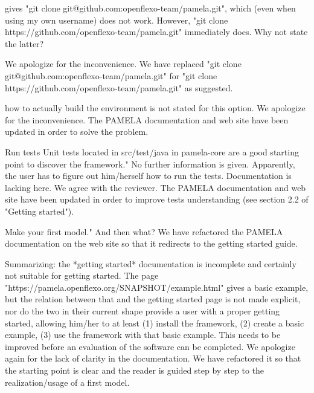 \documentclass[10pt]{article}
\begin{document}

\begin{response}{gives "git clone git@github.com:openflexo-team/pamela.git", which (even when using my own username) does not work. However, "git clone https://github.com/openflexo-team/pamela.git" immediately does. Why not state the latter?
}

We apologize for the inconvenience. We have replaced "git clone git@github.com:openflexo-team/pamela.git" for "git clone https://github.com/openflexo-team/pamela.git" as suggested.
\end{response}

\begin{response}{how to actually build the environment is not stated for this option.}
We apologize for the inconvenience. The PAMELA documentation and web site have been updated in order to solve the problem.
\end{response}

\begin{response}{Run tests Unit tests located in src/test/java in pamela-core are a good starting point to discover the framework." No further information is given. Apparently, the user has to figure out him/herself how to run the tests. Documentation is lacking here.
}
We agree with the reviewer. The PAMELA documentation and web site have been updated in order to improve tests understanding (see section 2.2 of "Getting started"). 
\end{response}

\begin{response}{Make your first model." And then what?
}
We have refactored the PAMELA documentation on the web site so that it redirects to the getting started guide.
\end{response}

\begin{response}{Summarizing: the *getting started* documentation is incomplete and certainly not suitable for getting started. The page "https://pamela.openflexo.org/SNAPSHOT/example.html" gives a basic example, but the relation between that and the getting started page is not made explicit, nor do the two in their current shape provide a user with a proper getting started, allowing him/her to at least (1) install the framework, (2) create a basic example, (3) use the framework with that basic example. This needs to be improved before an evaluation of the software can be completed.
}
We apologize again for the lack of clarity in the documentation. We have refactored it so that the starting point is clear and the reader is guided step by step to the realization/usage of a first model.
\end{response}
\end{document}
